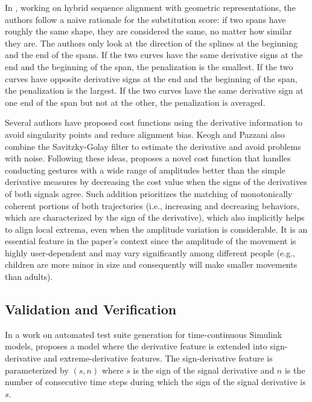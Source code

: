 \documentclass[11pt]{book}
\begin{document}
In \cite{urbano2012mirex}, working on hybrid sequence alignment with geometric representations, the authors follow a naive rationale for
the substitution score: if two spans have roughly the same shape,
they are considered the same, no matter how similar they are. The
authors only look at the direction of the splines at the beginning
and the end of the spans. If the two curves have the same derivative
signs at the end and the beginning of the span, the penalization is
the smallest. If the two curves have opposite derivative signs at
the end and the beginning of the span, the penalization is the largest.
If the two curves have the same derivative sign at one end of the
span but not at the other, the penalization is averaged.

Several authors have proposed cost functions using the derivative
information to avoid singularity points and reduce alignment bias.
Keogh and Pazzani also combine the Savitzky-Golay filter to estimate
the derivative and avoid problems with noise. Following these ideas,
\cite{schramm2014dynamic} proposes a novel cost function that handles
conducting gestures with a wide range of amplitudes better than the
simple derivative measures by decreasing the cost value when the signs
of the derivatives of both signals agree. Such addition prioritizes
the matching of monotonically coherent portions of both trajectories
(i.e., increasing and decreasing behaviors, which are characterized
by the sign of the derivative), which also implicitly helps to align
local extrema, even when the amplitude variation is considerable.
It is an essential feature in the paper's context since the amplitude
of the movement is highly user-dependent and may vary significantly
among different people (e.g., children are more minor in size and
consequently will make smaller movements than adults).


\subsection{Validation and Verification}

In a work on automated test suite generation for time-continuous Simulink models, \cite{matinnejad2016automated} proposes a model where the derivative feature is extended
into sign-derivative and extreme-derivative features. The sign-derivative
feature is parameterized by $\left(s,n\right)$ where $s$ is the
sign of the signal derivative and $n$ is the number of consecutive
time steps during which the sign of the signal derivative is $s$.
\end{document}
